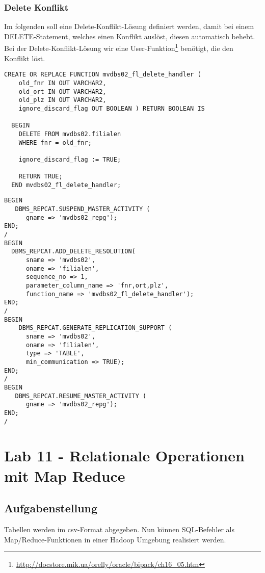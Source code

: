 \documentclass[a4paper,10pt,titlepage=false]{scrreprt}
\begin{document}
\subsection{Delete Konflikt}
Im folgenden soll eine Delete-Konflikt-Lösung definiert werden, damit bei einem DELETE-Statement, welches einen Konflikt auslöst, diesen automatisch behebt. Bei der Delete-Konflikt-Lösung wir eine User-Funktion\footnote{\url{http://docstore.mik.ua/orelly/oracle/bipack/ch16_05.htm}} benötigt, die den Konflikt löst.
\begin{lstlisting}[style=sql, title=Definiton des Konflikt-Lösungs-Handler als repadmin auf telesto]
CREATE OR REPLACE FUNCTION mvdbs02_fl_delete_handler (
    old_fnr IN OUT VARCHAR2,
    old_ort IN OUT VARCHAR2,
    old_plz IN OUT VARCHAR2,
    ignore_discard_flag OUT BOOLEAN ) RETURN BOOLEAN IS

  BEGIN
    DELETE FROM mvdbs02.filialen
    WHERE fnr = old_fnr;

    ignore_discard_flag := TRUE;

    RETURN TRUE;
  END mvdbs02_fl_delete_handler;
\end{lstlisting}

\begin{lstlisting}[style=sql, title=Definiton der Delete-Konflikt-Lösung als repadmin auf telesto]
BEGIN
   DBMS_REPCAT.SUSPEND_MASTER_ACTIVITY (
      gname => 'mvdbs02_repg');
END;
/
BEGIN
  DBMS_REPCAT.ADD_DELETE_RESOLUTION(
      sname => 'mvdbs02',
      oname => 'filialen',
      sequence_no => 1,
      parameter_column_name => 'fnr,ort,plz',
      function_name => 'mvdbs02_fl_delete_handler');
END;
/
BEGIN 
    DBMS_REPCAT.GENERATE_REPLICATION_SUPPORT (
      sname => 'mvdbs02',
      oname => 'filialen',
      type => 'TABLE',
      min_communication => TRUE); 
END;
/
BEGIN
   DBMS_REPCAT.RESUME_MASTER_ACTIVITY (
      gname => 'mvdbs02_repg');
END;
/
\end{lstlisting}


\chapter{Lab 11 - Relationale Operationen mit Map Reduce}
\section{Aufgabenstellung}
Tabellen werden im csv-Format abgegeben. Nun können SQL-Befehler als Map/Reduce-Funktionen in einer Hadoop Umgebung realisiert werden.
\end{document}
